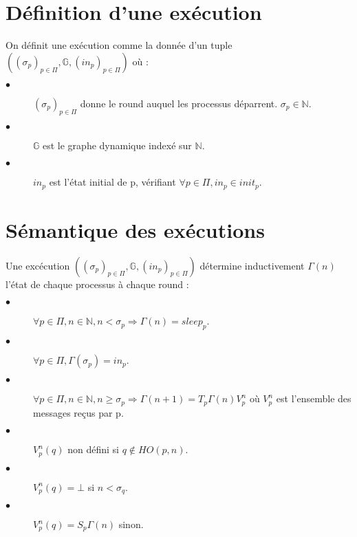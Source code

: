 \documentclass{article}
\begin{document}
\section{Définition d'une exécution}

On définit une exécution comme la donnée d'un tuple
$((\sigma_p)_{p \in \Pi}, \mathds{G}, (in_p)_{p \in \Pi})$ où :

\begin{description}

	\item[$\bullet$] $(\sigma_p)_{p \in \Pi}$ donne le round auquel les processus déparrent.
		$\sigma_p \in \mathds{N}$.
	\item[$\bullet$] $\mathds{G}$ est le graphe dynamique indexé sur $\mathds{N}$.
	\item[$\bullet$] $in_p$ est l'état initial de p, vérifiant $\forall p \in \Pi, in_p \in init_p$.

\end{description}

\section{Sémantique des exécutions}

Une excécution $((\sigma_p)_{p \in \Pi}, \mathds{G}, (in_p)_{p \in \Pi})$ détermine inductivement
$\Gamma(n)$ l'état de chaque processus à chaque round :

\begin{description}

	\item[$\bullet$] $\forall p \in \Pi,  n \in \mathds{N},
		n < \sigma_p \Rightarrow \Gamma(n) = sleep_p$.
	\item[$\bullet$] $\forall p \in \Pi, \Gamma(\sigma_p) = in_p$.
	\item[$\bullet$] $\forall p \in \Pi,  n \in \mathds{N}, n \geq \sigma_p \Rightarrow
		\Gamma(n+1) = T_p \Gamma(n) V_p^n$ où $V_p^n$ est l'ensemble des messages reçus par p.
	\item[$\bullet$] $V_p^n(q)$ non défini si $q \notin HO(p, n)$.
	\item[$\bullet$] $V_p^n(q) = \bot$ si $n < \sigma_q$.
	\item[$\bullet$] $V_p^n(q) = S_p \Gamma(n)$ sinon.

\end{description}
\end{document}
